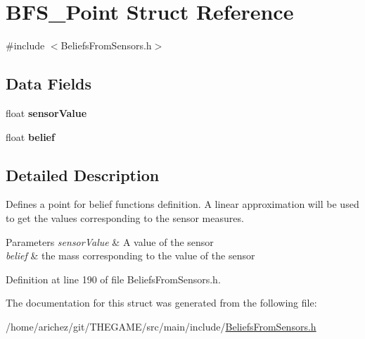 \hypertarget{struct_b_f_s___point}{\section{B\-F\-S\-\_\-\-Point Struct Reference}
\label{struct_b_f_s___point}
}


{\ttfamily \#include $<$Beliefs\-From\-Sensors.\-h$>$}

\subsection*{Data Fields}
\begin{DoxyCompactItemize}
\item 
\hypertarget{struct_b_f_s___point_a5b89170903f5d655f0e21e500138425b}{float {\bfseries sensor\-Value}}\label{struct_b_f_s___point_a5b89170903f5d655f0e21e500138425b}

\item 
\hypertarget{struct_b_f_s___point_a6e4486fe342cdfe9f04042b551e1651e}{float {\bfseries belief}}\label{struct_b_f_s___point_a6e4486fe342cdfe9f04042b551e1651e}

\end{DoxyCompactItemize}


\subsection{Detailed Description}
Defines a point for belief functions definition. A linear approximation will be used to get the values corresponding to the sensor measures. 
\begin{DoxyParams}{Parameters}
{\em sensor\-Value} & A value of the sensor \\
\hline
{\em belief} & the mass corresponding to the value of the sensor \\
\hline
\end{DoxyParams}


Definition at line 190 of file Beliefs\-From\-Sensors.\-h.



The documentation for this struct was generated from the following file\-:\begin{DoxyCompactItemize}
\item 
/home/arichez/git/\-T\-H\-E\-G\-A\-M\-E/src/main/include/\hyperlink{_beliefs_from_sensors_8h}{Beliefs\-From\-Sensors.\-h}\end{DoxyCompactItemize}
